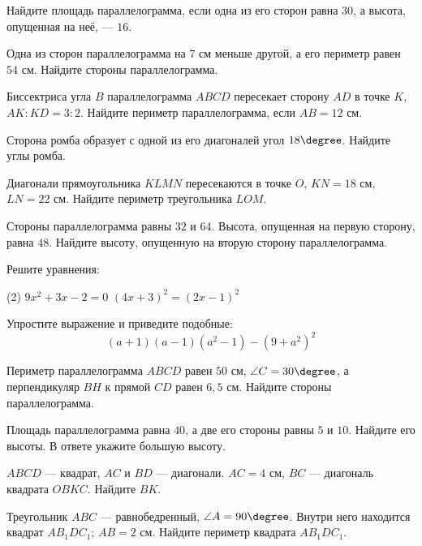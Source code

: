 \begin{exam}
	\begin{listofex}
		\item Найдите площадь параллелограмма, если одна из его сторон равна \( 30 \), а высота, опущенная на неё, --- \( 16 \).
		\item Одна из сторон параллелограмма на \( 7 \) см меньше другой, а его периметр равен \( 54 \) см. Найдите стороны параллелограмма.
		\item Биссектриса угла \( B \) параллелограмма \( ABCD \) пересекает сторону \( AD \) в точке \( K \), \( AK:KD=3:2 \). Найдите периметр параллелограмма, если \( AB=12 \) см.
		\item Сторона ромба образует с одной из его диагоналей угол \( 18\degree \). Найдите углы ромба.
		\item Диагонали прямоугольника \( KLMN \) пересекаются в точке \( O \), \( KN=18 \) см, \( LN=22 \) см. Найдите периметр треугольника \( LOM \).
		\item Стороны параллелограмма равны \( 32 \) и \( 64 \). Высота, опущенная на первую сторону, равна \( 48 \). Найдите высоту, опущенную на вторую сторону параллелограмма.
		\item Решите уравнения:
		\begin{tasks}(2)
			\task \( 9x^2+3x-2=0 \)
			\task \( (4x+3)^2=(2x-1)^2 \)
		\end{tasks}
		\item Упростите выражение и приведите подобные: \\ \[ (a+1)(a-1)(a^2-1)-(9+a^2)^2 \]
	\end{listofex}
\end{exam}

\begin{consultation}
	\begin{listofex}
		\item Периметр параллелограмма \( ABCD \) равен \( 50 \) см, \( \angle C = 30\degree \), а перпендикуляр \( BH \) к прямой \( CD \) равен \( 6,5 \) см. Найдите стороны параллелограмма.
		\item Площадь параллелограмма равна \( 40 \), а две его стороны равны \( 5 \) и \( 10 \). Найдите его высоты. В ответе укажите большую высоту.
		\item \( ABCD \) --- квадрат, \( AC \) и \( BD \) --- диагонали. \( AC = 4  \) см, \( BC \) --- диагональ квадрата \( OBKC \).  Найдите \( BK \).
		\item Треугольник \( ABC \) --- равнобедренный, \( \angle A=90\degree \). Внутри него находится квадрат \( AB_1DC_1 \); \( AB = 2 \) см. Найдите периметр квадрата \( AB_1DC_1  \).
	\end{listofex}
\end{consultation}
